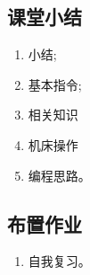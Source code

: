 \subsection{课堂小结}
\begin{enumerate}[1、]
	\item 小结;
	\item 基本指令;
	\item 相关知识
	\item 机床操作
	\item 编程思路。
\end{enumerate}

\vfill
\subsection{布置作业}
\begin{enumerate}[1、]
	\item 自我复习。
\end{enumerate}
\vfill